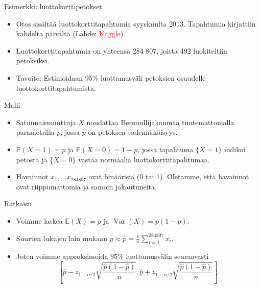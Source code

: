 \documentclass{beamer}
\DeclareMathOperator{\var}{Var}
\begin{document}

\begin{frame}{Esimerkki: luottokorttipetokset}
  \begin{itemize}
    \item Otos sisältää luottokorttitapahtumia syyskuulta 2013. Tapahtumia
    kirjattiin kahdelta päivältä
    (Lähde: \href{https://www.kaggle.com/datasets/mlg-ulb/creditcardfraud?resource=download}{\textcolor{red}{Kaggle}}).
    \pause
    \item Luottokorttitapahtumia on yhteensä 284 807, joista 492 luokiteltiin
    petoksiksi.
    \pause
    \item Tavoite: Estimoidaan 95\% luottamusväli petoksien osuudelle
    luottokorttitapahtumista.
  \end{itemize}
\end{frame}


\begin{frame}{Malli}
  \begin{itemize}
    \item Satunnaismuuttuja $X$ noudattaa Bernoullijakaumaa tuntemattomalla
    parametrilla $p$, jossa $p$ on petoksen todennäköisyys.
    \item $\mathbb{P}\left(X = 1\right) = p$ ja $\mathbb{P}\left(X = 0\right) =
    1 - p$, jossa tapahtuma $\{X = 1\}$ indikoi petosta ja $\{X = 0\}$ vastaa
    normaalia luottokorttitapahtumaa.
    \item Havainnot $x_1, \ldots x_{284807}$ ovat binäärisiä (0 tai 1).
    Oletamme, että havainnot ovat riippumattomia ja samoin jakautuneita.
  \end{itemize}
\end{frame}


\begin{frame}{Ratkaisu}
  \begin{itemize}
    \item Voimme laskea $\mathbb{E}\left(X\right) = p$ ja $\var\left(X\right) =
    p(1-p)$.
    \item Suurten lukujen lain mukaan $p \approx \hat p =
    \frac{1}{n}\sum_{i=1}^{284807} x_i$.
    \item Joten voimme approksimoida $95\%$ luottamusvälin seuraavasti
    \begin{equation*}
      \left[\hat p - z_{1 - \alpha/2}\sqrt{\frac{\hat p(1-\hat p)}{n}},
      \hat p + z_{1 - \alpha/2}\sqrt{\frac{\hat p(1-\hat p)}{n}}\right].
    \end{equation*}
  \end{itemize}
\end{frame}
\end{document}
